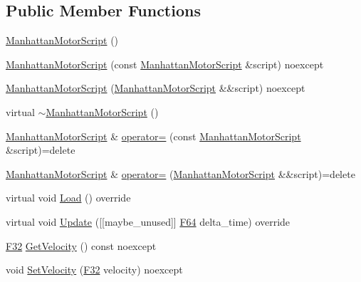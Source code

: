 \subsection*{Public Member Functions}
\begin{DoxyCompactItemize}
\item 
\hyperlink{classmage_1_1script_1_1_manhattan_motor_script_a042ae1a4a53d27c75ff85d5728ac3289}{Manhattan\+Motor\+Script} ()
\item 
\hyperlink{classmage_1_1script_1_1_manhattan_motor_script_a5c3bc9b400243333b661e4fd0e6e74b6}{Manhattan\+Motor\+Script} (const \hyperlink{classmage_1_1script_1_1_manhattan_motor_script}{Manhattan\+Motor\+Script} \&script) noexcept
\item 
\hyperlink{classmage_1_1script_1_1_manhattan_motor_script_a62843ba8d660b496bec036082a0867f6}{Manhattan\+Motor\+Script} (\hyperlink{classmage_1_1script_1_1_manhattan_motor_script}{Manhattan\+Motor\+Script} \&\&script) noexcept
\item 
virtual \hyperlink{classmage_1_1script_1_1_manhattan_motor_script_aca76d9d5be76b048ec247e93e4a89adb}{$\sim$\+Manhattan\+Motor\+Script} ()
\item 
\hyperlink{classmage_1_1script_1_1_manhattan_motor_script}{Manhattan\+Motor\+Script} \& \hyperlink{classmage_1_1script_1_1_manhattan_motor_script_a7a6280230faa4d42a141e1d7768bcd0d}{operator=} (const \hyperlink{classmage_1_1script_1_1_manhattan_motor_script}{Manhattan\+Motor\+Script} \&script)=delete
\item 
\hyperlink{classmage_1_1script_1_1_manhattan_motor_script}{Manhattan\+Motor\+Script} \& \hyperlink{classmage_1_1script_1_1_manhattan_motor_script_a2b185979a64b35d9f9d6f4027724560a}{operator=} (\hyperlink{classmage_1_1script_1_1_manhattan_motor_script}{Manhattan\+Motor\+Script} \&\&script)=delete
\item 
virtual void \hyperlink{classmage_1_1script_1_1_manhattan_motor_script_aea733198d0f4b6e46815c3b91c3e8751}{Load} () override
\item 
virtual void \hyperlink{classmage_1_1script_1_1_manhattan_motor_script_ae7fbaba1da04d00257e5d491868efc53}{Update} (\mbox{[}\mbox{[}maybe\+\_\+unused\mbox{]}\mbox{]} \hyperlink{namespacemage_ad26233bbec640deda836e572c1a23708}{F64} delta\+\_\+time) override
\item 
\hyperlink{namespacemage_aa97e833b45f06d60a0a9c4fc22ae02c0}{F32} \hyperlink{classmage_1_1script_1_1_manhattan_motor_script_a2f73545bf2fb507375251d530054ac9b}{Get\+Velocity} () const noexcept
\item 
void \hyperlink{classmage_1_1script_1_1_manhattan_motor_script_acf4db52ae6b0c9f97c0b7e719acea6bc}{Set\+Velocity} (\hyperlink{namespacemage_aa97e833b45f06d60a0a9c4fc22ae02c0}{F32} velocity) noexcept
\end{DoxyCompactItemize}
